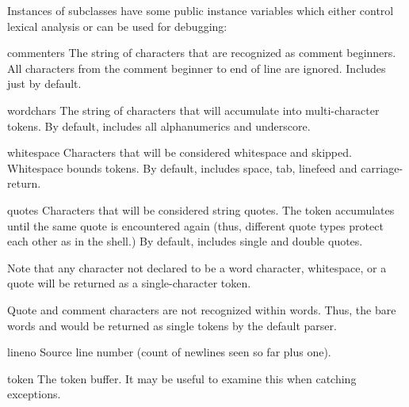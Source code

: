Instances of  subclasses have some public instance
variables which either control lexical analysis or can be used
for debugging:

\begin{memberdesc}{commenters}
The string of characters that are recognized as comment beginners.
All characters from the comment beginner to end of line are ignored.
Includes just \character{\#} by default.   
\end{memberdesc}

\begin{memberdesc}{wordchars}
The string of characters that will accumulate into multi-character
tokens. By default, includes all \ASCII{} alphanumerics and
underscore.
\end{memberdesc}

\begin{memberdesc}{whitespace}
Characters that will be considered whitespace and skipped.  Whitespace
bounds tokens.  By default, includes space, tab, linefeed and
carriage-return.
\end{memberdesc}

\begin{memberdesc}{quotes}
Characters that will be considered string quotes.  The token
accumulates until the same quote is encountered again (thus, different
quote types protect each other as in the shell.)  By default, includes
\ASCII{} single and double quotes.
\end{memberdesc}

Note that any character not declared to be a word character,
whitespace, or a quote will be returned as a single-character token.

Quote and comment characters are not recognized within words.  Thus,
the bare words  and  would be returned as single
tokens by the default parser.

\begin{memberdesc}{lineno}
Source line number (count of newlines seen so far plus one).
\end{memberdesc}

\begin{memberdesc}{token}
The token buffer.  It may be useful to examine this when catching
exceptions.
\end{memberdesc}
